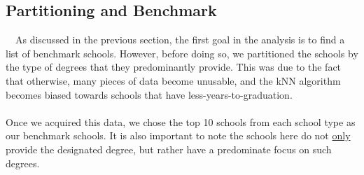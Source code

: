 \documentclass[12pt]{scrartcl}
\begin{document}
	\subsection{Partitioning and Benchmark}
		\ \ As discussed in the previous section, the first goal in the analysis is to find a list of benchmark schools. However, before doing so, we partitioned the schools by the type of degrees that they predominantly provide. This was due to the fact that otherwise, many pieces of data become unusable, and the kNN algorithm becomes biased towards schools that have less-years-to-graduation.\\ 
		\\
		Once we acquired this data, we chose the top 10 schools from each school type as our benchmark schools. It is also important to note the schools here do not \underline{only} provide the designated degree, but rather have a predominate focus on such degrees.\\
		\begin{figure}[H]
		\centering
		\qquad
		\end{figure}
		
\end{document}
